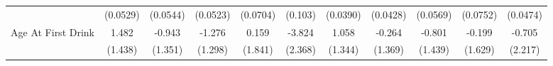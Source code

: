 {\begin{tabular}{l*{10}{c}}
            &    (0.0529)         &    (0.0544)         &    (0.0523)         &    (0.0704)         &     (0.103)         &    (0.0390)         &    (0.0428)         &    (0.0569)         &    (0.0752)         &    (0.0474)         \\
\addlinespace
Age At First Drink&       1.482         &      -0.943         &      -1.276         &       0.159         &      -3.824         &       1.058         &      -0.264         &      -0.801         &      -0.199         &      -0.705         \\
            &     (1.438)         &     (1.351)         &     (1.298)         &     (1.841)         &     (2.368)         &     (1.344)         &     (1.369)         &     (1.439)         &     (1.629)         &     (2.217)         \\
\bottomrule
\end{tabular}
}
